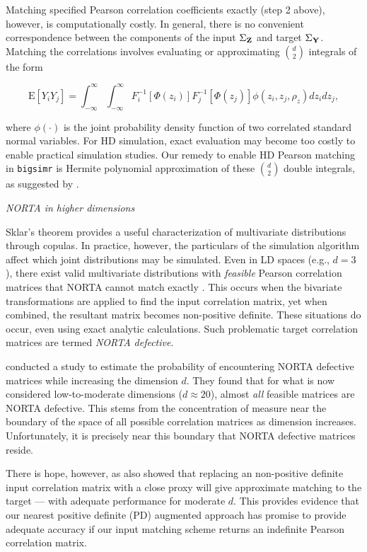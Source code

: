 \documentclass[
]{jss}
\begin{document}
Matching specified Pearson correlation coefficients exactly (step 2 above), however, is computationally costly. In general, there is no convenient correspondence between the components of the input \(\Sigma_{\bf Z}\) and target \(\Sigma_{\bf Y}\). Matching the correlations involves evaluating or approximating \(\binom{d}{2}\) integrals of the form

\begin{equation}
    \mathrm{E}\left[Y_i Y_j\right] = \int_{-\infty}^{\infty} \int_{-\infty}^{\infty} F_i^{-1}\left[\Phi(z_i)\right] F_j^{-1}\left[\Phi(z_j)\right] \phi(z_i, z_j, \rho_z) dz_i dz_j,
    \label{eq:pearsonIntegralRelation}
\end{equation}

where \(\phi(\cdot)\) is the joint probability density function of two correlated standard normal variables. For HD simulation, exact evaluation may become too costly to enable practical simulation studies. Our remedy to enable HD Pearson matching in \texttt{bigsimr} is Hermite polynomial approximation of these \(\binom{d}{2}\) double integrals, as suggested by \citet{XZ19}.

\emph{NORTA in higher dimensions}

Sklar's theorem provides a useful characterization of multivariate distributions through copulas. In practice, however, the particulars of the simulation algorithm affect which joint distributions may be simulated. Even in LD spaces (e.g., \(d=3\)), there exist valid multivariate distributions with \emph{feasible} Pearson correlation matrices that NORTA cannot match exactly \citep{LH75}. This occurs when the bivariate transformations are applied to find the input correlation matrix, yet when combined, the resultant matrix becomes non-positive definite. These situations do occur, even using exact analytic calculations. Such problematic target correlation matrices are termed \emph{NORTA defective}.

\citet{GH02} conducted a study to estimate the probability of encountering NORTA defective matrices while increasing the dimension \(d\). They found that for what is now considered low-to-moderate dimensions (\(d \approx 20\)), almost \emph{all} feasible matrices are NORTA defective. This stems from the concentration of measure near the boundary of the space of all possible correlation matrices as dimension increases. Unfortunately, it is precisely near this boundary that NORTA defective matrices reside.

There is hope, however, as \citet{GH02} also showed that replacing an non-positive definite input correlation matrix with a close proxy will give approximate matching to the target --- with adequate performance for moderate \(d\). This provides evidence that our nearest positive definite (PD) augmented approach has promise to provide adequate accuracy if our input matching scheme returns an indefinite Pearson correlation matrix.
\end{document}
